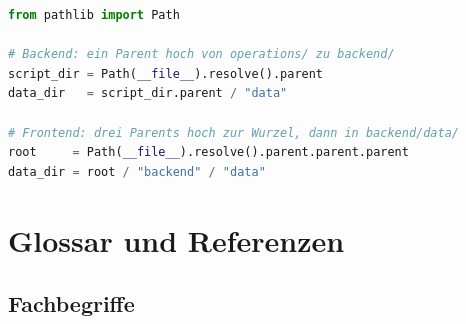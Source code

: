 \documentclass[11pt, a4paper, oneside, openany]{report}
\begin{document}
\begin{lstlisting}[language=Python, caption={Pfadauflösungsmuster\;---\;keine hartcodierten Pfade}]
from pathlib import Path

# Backend: ein Parent hoch von operations/ zu backend/
script_dir = Path(__file__).resolve().parent
data_dir   = script_dir.parent / "data"

# Frontend: drei Parents hoch zur Wurzel, dann in backend/data/
root     = Path(__file__).resolve().parent.parent.parent
data_dir = root / "backend" / "data"
\end{lstlisting}


\chapter{Glossar und Referenzen}
\label{ch:glossar}

\section{Fachbegriffe}
\end{document}
